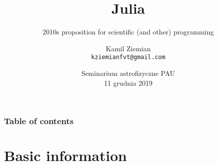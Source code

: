 \documentclass[10pt,t]{beamer}
\title{Julia}
\subtitle{2010s proposition for scientific (and other) programming}
\author{Kamil Ziemian \\
  \texttt{kziemianfvt@gmail.com}}
\institute{Uniwersytet Jagielloński w~Krakowie}
\date[11 December 2018]{Seminarium astrofizyczne PAU \\
  11 grudnia 2019}
\begin{document}






\RaggedRight





\maketitle %





\begin{frame}
  \frametitle{Table of contents}


  \tableofcontents %

\end{frame}










\section{Basic information}
\end{document}
